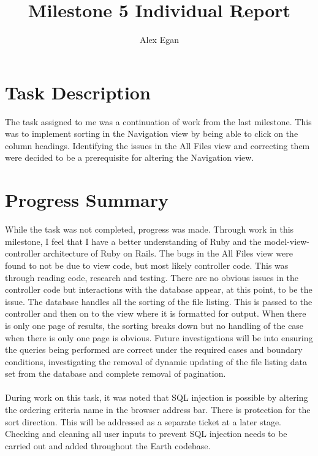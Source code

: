 \documentclass[10pt, a4]{article}
\begin{document}
\title{Milestone 5 Individual Report}
\author{Alex Egan}
\date{ }

\maketitle
 
\section{Task Description}
The task assigned to me was a continuation of work from the last milestone. This was to implement sorting in the Navigation view by being able to click on the column headings. Identifying the issues in the All Files view and correcting them were decided to be a prerequisite for altering the Navigation view.

\section{Progress Summary}
\label{prog-sum}
While the task was not completed, progress was made. Through work in this milestone, I feel that I have a better understanding of Ruby and the model-view-controller architecture of Ruby on Rails. The bugs in the All Files view were found to not be due to view code, but most likely controller code. This was through reading code, research and testing. There are no obvious issues in the controller code but interactions with the database appear, at this point, to be the issue. The database handles all the sorting of the file listing. This is passed to the controller and then on to the view where it is formatted for output. When there is only one page of results, the sorting breaks down but no handling of the case when there is only one page is obvious. Future investigations will be into ensuring the queries being performed are correct under the required cases and boundary conditions, investigating the removal of dynamic updating of the file listing data set from the database and complete removal of pagination.\\
\\
During work on this task, it was noted that SQL injection is possible by altering the ordering criteria name in the browser address bar. There is protection for the sort direction. This will be addressed as a separate ticket at a later stage. Checking and cleaning all user inputs to prevent SQL injection needs to be carried out and added throughout the Earth codebase.
\end{document}
